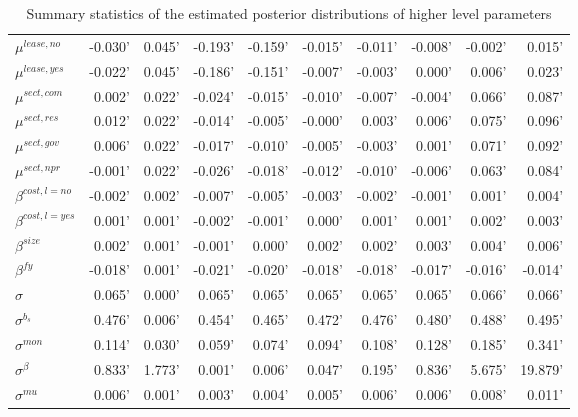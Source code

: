 \documentclass[a4paper]{article}
\begin{document}
\begin{table}
\begin{tabular}{lrrrrrrrrr}
  $\mu^{lease, no}$   & -0.030' & 0.045' & -0.193' & -0.159' & -0.015' & -0.011' & -0.008' & -0.002' &  0.015' \\
  $\mu^{lease, yes}$   & -0.022' & 0.045' & -0.186' & -0.151' & -0.007' & -0.003' &  0.000' &  0.006' &  0.023' \\
  $\mu^{sect, com}$      &  0.002' & 0.022' & -0.024' & -0.015' & -0.010' & -0.007' & -0.004' &  0.066' &  0.087' \\
  $\mu^{sect, res}$       &  0.012' & 0.022' & -0.014' & -0.005' & -0.000' &  0.003' &  0.006' &  0.075' &  0.096' \\
  $\mu^{sect, gov}$       &  0.006' & 0.022' & -0.017' & -0.010' & -0.005' & -0.003' &  0.001' &  0.071' &  0.092' \\
  $\mu^{sect, npr}$      & -0.001' & 0.022' & -0.026' & -0.018' & -0.012' & -0.010' & -0.006' &  0.063' &  0.084' \\
  $\beta^{cost, l=no}$  & -0.002' & 0.002' & -0.007' & -0.005' & -0.003' & -0.002' & -0.001' &  0.001' &  0.004' \\
  $\beta^{cost, l=yes}$  &  0.001' & 0.001' & -0.002' & -0.001' &  0.000' &  0.001' &  0.001' &  0.002' &  0.003' \\
  $\beta^{size}$  &  0.002' & 0.001' & -0.001' &  0.000' &  0.002' &  0.002' &  0.003' &  0.004' &  0.006' \\
  $\beta^{fy}$    & -0.018' & 0.001' & -0.021' & -0.020' & -0.018' & -0.018' & -0.017' & -0.016' & -0.014' \\
  $\sigma$      &  0.065' & 0.000' &  0.065' &  0.065' &  0.065' &  0.065' &  0.065' &  0.066' &  0.066' \\
  $\sigma^{b_s}$    &  0.476' & 0.006' &  0.454' &  0.465' &  0.472' &  0.476' &  0.480' &  0.488' &  0.495' \\
  $\sigma^{mon}$   &  0.114' & 0.030' &  0.059' &  0.074' &  0.094' &  0.108' &  0.128' &  0.185' &  0.341' \\
  $\sigma^{\beta}$  &  0.833' & 1.773' &  0.001' &  0.006' &  0.047' &  0.195' &  0.836' &  5.675' & 19.879' \\
  $\sigma^{mu}$   &  0.006' & 0.001' &  0.003' &  0.004' &  0.005' &  0.006' &  0.006' &  0.008' &  0.011' \\
  \bottomrule
  \end{tabular}
\label{table:higher_level_params}
\caption{Summary statistics of the estimated posterior distributions of higher level parameters}
\end{table}

\end{document}
